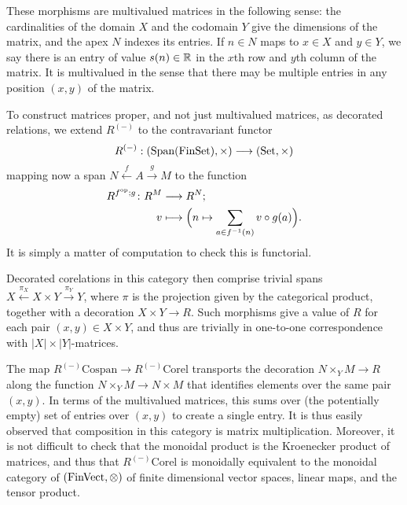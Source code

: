 These morphisms are multivalued matrices in the following sense: the
cardinalities of the domain $X$ and the codomain $Y$ give the dimensions of the
matrix, and the apex $N$ indexes its entries. If $n \in N$ maps to $x \in X$ and
$y \in Y$, we say there is an entry of value $s(n) \in {\mathbb{R}}$ in the $x$th row and
$y$th column of the matrix. It is multivalued in the sense that there may be
multiple entries in any position $(x,y)$ of the matrix.

To construct matrices proper, and not just multivalued matrices, as decorated
relations, we extend $R^{(-)}$ to the contravariant functor
\[
  R^{(-)}: (\mathrm{Span(FinSet)},\times) \longrightarrow (\mathrm{Set},\times)
\]
mapping now a span $N \stackrel{f}\leftarrow A \stackrel{g}\to M$ to the
function
\begin{align*}
  R^{f^{\mathrm{op}};g}{\colon} R^M &\longrightarrow R^N; \\
  v &\longmapsto \Big(n \mapsto \sum_{a \in f^{-1}(n)} v\circ g(a)\Big).
\end{align*}
It is simply a matter of computation to check this is functorial.

Decorated corelations in this category then comprise trivial spans $X
\xleftarrow{\pi_X} X \times Y \xrightarrow{\pi_Y} Y$, where $\pi$ is the
projection given by the categorical product, together with a decoration $X\times
Y \to R$. Such morphisms give a value of $R$ for each pair $(x,y) \in X \times
Y$, and thus are trivially in one-to-one correspondence with $\lvert X \rvert
\times \lvert Y\rvert$-matrices. 

The map $R^{(-)}\mathrm{Cospan} \to R^{(-)}\mathrm{Corel}$ transports the
decoration $N\times_YM \to R$ along the function $N \times_YM \to N \times M$
that identifies elements over the same pair $(x,y)$. In terms of the multivalued
matrices, this sums over (the potentially empty) set of entries over $(x,y)$ to
create a single entry. It is thus easily observed that composition in this
category is matrix multiplication. Moreover, it is not difficult to check that
the monoidal product is the Kroenecker product of matrices, and thus that
$R^{(-)}\mathrm{Corel}$ is monoidally equivalent to the monoidal category of
$(\mathrm{FinVect}, \otimes)$ of finite dimensional vector spaces, linear maps, and the
tensor product.


